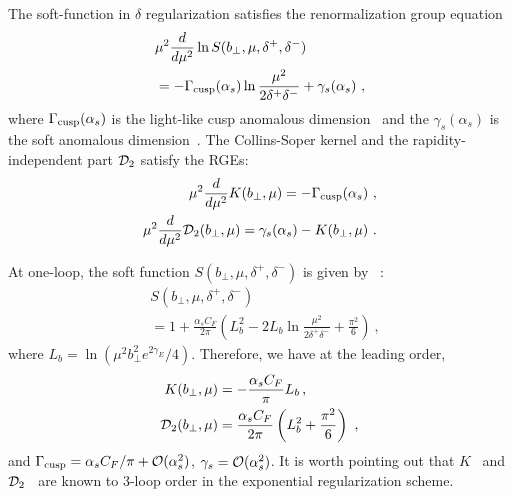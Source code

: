 The soft-function in $\delta$ regularization satisfies the renormalization group equation
\begin{align}
	&\mu^2\frac{d}{d\mu^2}\ln S(b_\perp,\mu,\delta^+,\delta^-)\nonumber \\
	&=-\Gamma_{\rm cusp}(\alpha_s)\ln \frac{\mu^2}{2\delta^+\delta^-} + \gamma_s(\alpha_s)\ ,
\end{align}
where $\Gamma_{\rm cusp}(\alpha_s) $ is the light-like cusp anomalous dimension~\cite{Polyakov:1980ca,Korchemsky:1987wg} and the $\gamma_s(\alpha_s)$ is the soft anomalous dimension~\cite{Korchemskaya:1992je}. The Collins-Soper kernel and the rapidity-independent part ${\cal D}_2$ satisfy the RGEs:
\begin{align}
	\mu^2\frac{d}{d\mu^2} K(b_\perp,\mu)=-\Gamma_{\rm cusp}(\alpha_s) \label{eq:cusp}\ ,\\
	\mu^2\frac{d}{d\mu^2} {\cal D}_2(b_\perp,\mu)=\gamma_s(\alpha_s)-K(b_\perp,\mu) \label{eq:ad_d2}\ .
\end{align}

At one-loop, the soft function $S(b_\perp,\mu,\delta^+,\delta^-)$ is given by~\cite{Echevarria:2012js} :
\begin{align}
	&S(b_\perp,\mu,\delta^+,\delta^-)\nonumber \\ &=1+\frac{\alpha_s C_F}{2\pi}\left(L_b^2-2L_b \ln \frac{\mu^2}{2\delta^+\delta^-}+\frac{\pi^2}{6}\right) \ ,
\end{align}
where $L_b=\ln\left(\mu^2 b_\perp^2e^{2\gamma_E}/4\right)$.
Therefore, we have at the leading order,
\begin{align}
	K(b_\perp,\mu)&=-\frac{\alpha_sC_F}{\pi} L_b  \,,\\
	{\cal D}_2(b_\perp,\mu)&=\frac{\alpha_s C_F}{2\pi}\left(L_b^2+\frac{\pi^2}{6}\right) \ ,
\end{align}
and $\Gamma_{\rm cusp}=\alpha_s C_F/\pi +{\cal O}(\alpha_s^2)$, $\gamma_s={\cal O}(\alpha_s^2)$. It is worth pointing out that $K$~\cite{Li:2016ctv,Vladimirov:2016dll} and ${\cal D}_2$~\cite{Li:2016ctv} are known to 3-loop order in the exponential regularization scheme.

